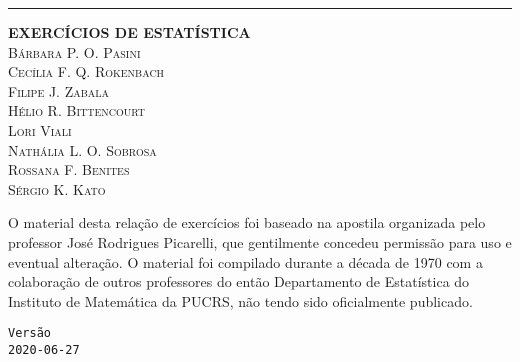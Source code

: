 \documentclass[11pt,fleqn]{book} %
\begin{document}

\begin{titlepage} %

	\raggedleft %
	
	\rule{1pt}{\textheight} %
	\hspace{0.04\textwidth} %
	\parbox[b]{0.9\textwidth}{ %
		
		{\Huge {\ttfamily \textbf{EXERCÍCIOS DE ESTATÍSTICA}}} \\[3\baselineskip]
		{\Large\textsc{Bárbara P. O. Pasini} \\ \Large\textsc{Cecília F. Q. Rokenbach} \\ \Large\textsc{Filipe J. Zabala} \\ \Large\textsc{Hélio R. Bittencourt} \\ \Large\textsc{Lori Viali} \\ \Large\textsc{Nathália L. O. Sobrosa} \\ \Large\textsc{Rossana F. Benites} \\ \Large\textsc{Sérgio K. Kato} } %
	
		\vspace{0.5\textheight} %
		
		\noindent O material desta relação de exercícios foi baseado na apostila organizada pelo professor José Rodrigues Picarelli, que gentilmente concedeu permissão para uso e eventual alteração. O material foi compilado durante a década de 1970 com a colaboração de outros professores do então Departamento de Estatística do Instituto de Matemática da PUCRS, não tendo sido oficialmente publicado.
\\[2\baselineskip]
		
\begin{center}
\texttt{Versão}\\ 
\texttt{2020-06-27} 
\end{center}
		
	}

\end{titlepage}
\end{document}
